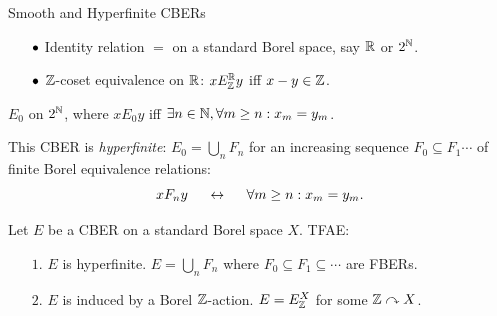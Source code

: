 \documentclass{beamer}
\begin{document}
    \begin{frame}{Smooth and Hyperfinite CBERs}
        \vspace{-0.1in}
        \begin{example}[Smooth]
            \begin{itemize}
                \item[\scriptsize$\bullet$] Identity relation $=$ on a standard Borel space, say $\mathbb{R}$ or $2^{\mathbb{N}}$.
                    \pause
                \item[\scriptsize$\bullet$] $\mathbb{Z}$-coset equivalence on $\mathbb{R}$: $xE^{\mathbb{R}}_{\mathbb{Z}} y$ iff $x-y\in\mathbb{Z}$.
            \end{itemize}
        \end{example}

        \pause
        \vspace{-0.1in}

        \begin{example}[Hyperfinite]
            $E_0$ on $2^{\mathbb{N}}$, where $xE_0y$ iff $\exists n\in\mathbb{N},\forall m\geq n:x_m=y_m$.
        \end{example}

        \pause

        This CBER is \textit{hyperfinite}: $E_0=\bigcup_nF_n$ for an increasing sequence $F_0\subseteq F_1\cdots$ of finite Borel equivalence relations:
        \pause
        \vspace{-0.1in}
        \begin{equation*}
            xF_ny\ \ \ \ \leftrightarrow\ \ \ \ \forall m\geq n:x_m=y_m.
        \end{equation*}

        \pause
        \vspace{-0.15in}

        \begin{theorem}
            Let $E$ be a CBER on a standard Borel space $X$. TFAE:
            \begin{itemize}
                \item[$1.$] $E$ is hyperfinite. {\color{gray}\footnotesize $E=\bigcup_nF_n$ where $F_0\subseteq F_1\subseteq\cdots$ are FBERs.}
                \item[$2.$] $E$ is induced by a Borel $\mathbb{Z}$-action. {\color{gray}\footnotesize $E=E_{\mathbb{Z}}^X$ for some $\mathbb{Z}\curvearrowright X$.}
            \end{itemize}
        \end{theorem}
    \end{frame}
\end{document}
